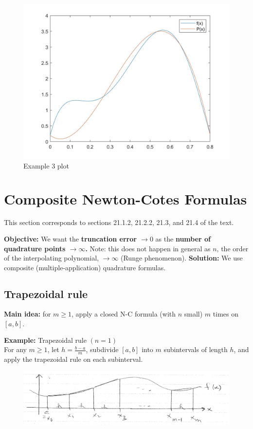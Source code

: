 \documentclass [titlepage,12pt,letter] {article}
\begin{document}
\begin{figure} 
  \centering
  \includegraphics[scale=0.3]{lect15_ex3}
  \caption{Example 3 plot}
  \label{fig:lect15_ex3}
\end{figure}
\section{Composite Newton-Cotes Formulas} 

This section corresponds to sections 21.1.2, 21.2.2, 21.3, and 21.4 of the text.

{\bf Objective:} We want the {\bf truncation error $\rightarrow 0$} as the {\bf number of quadrature points $\rightarrow \infty$.}
Note: this does not happen in general as $n$, the order of the interpolating polynomial, $\rightarrow \infty$ (Runge phenomenon).
{\bf Solution:} We use composite (multiple-application) quadrature formulas.


\subsection{Trapezoidal rule} 

{\bf Main idea:} for $m \geq 1$, apply a closed N-C formula (with $n$ small) $m$ times on $[a,b]$. 

\noindent 
{\bf Example:} Trapezoidal rule $(n=1)$ 
\\
For any $m \geq 1$, let $h = \frac{b-a}{m}$, subdivide $[a,b]$ into $m$ subintervals of length $h$, and apply the trapezoidal rule on each subinterval. 


\begin{figure}[h] 
  \centering
  \includegraphics[scale=0.4]{composite_nc}
  \label{fig:composite_nc}
\end{figure}
\end{document}
